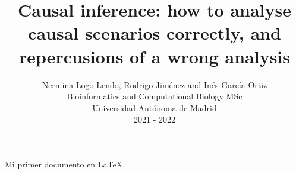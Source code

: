 \documentclass{article}
\title{Causal inference: how to analyse causal scenarios correctly, and repercusions of a wrong analysis}
\author{Nermina Logo Lendo, Rodrigo Jiménez and Inés García Ortiz\\
      Bioinformatics and Computational Biology MSc\\
      Universidad Autónoma de Madrid\\
      2021 - 2022}
\begin{document}
\maketitle

Mi primer documento en \LaTeX{}.
\end{document}
